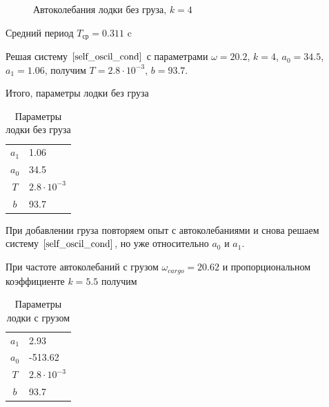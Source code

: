 \documentclass[12pt,a4paper]{article}
\begin{document}
\begin{figure}[h]
	\caption{Автоколебания лодки без груза, $k = 4$}
\end{figure}

Средний период $T_{\text{ср}} = 0.311$ c

Решая систему $\ref{self_oscil_cond}$ с параметрами $\omega = 20.2$, $k = 4$, $a_0 = 34.5$, $a_1 = 1.06$, получим $T = 2.8 \cdot 10^{-3}$, $b = 93.7$.

Итого, параметры лодки без груза 

\begin{table}[h]
	\caption{Параметры лодки без груза}
	\label{table:boat_params_no_cargo}
	\begin{center}
		\begin{tabular}{cl}
			$a_1$ &  1.06 \\
			$a_0$ &  34.5 \\
			$T$ & $2.8 \cdot 10^{-3}$ \\
			$b$ & 93.7 \\
		\end{tabular}
	\end{center}
\end{table}

При добавлении груза повторяем опыт с автоколебаниями и снова решаем систему $\ref{self_oscil_cond}$, но уже относительно $a_0$ и $a_1$.

При частоте автоколебаний с грузом $\omega_{cargo} = 20.62$ и пропорциональном коэффициенте $k = 5.5$ получим

\begin{table}[h]
	\caption{Параметры лодки с грузом}
	\label{table:boat_params_cargo}
	\begin{center}
		\begin{tabular}{cl}
			$a_1$ &  2.93 \\
			$a_0$ &  -513.62 \\
			$T$ & $2.8 \cdot 10^{-3}$ \\
			$b$ & 93.7 \\
		\end{tabular}
	\end{center}
\end{table}
\end{document}
